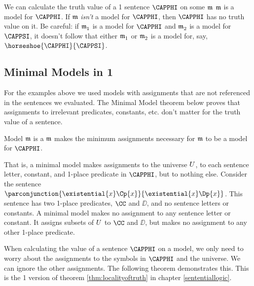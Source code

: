 We can calculate the truth value of a \GQL{}1 sentence $\CAPPHI$ on some $\mathfrak{m}$ \Iff $\mathfrak{m}$ is a model for $\CAPPHI$.  If $\mathfrak{m}$ \emph{isn't} a model for $\CAPPHI$, then $\CAPPHI$ has no truth value on it.  Be careful: if $\mathfrak{m^{\mathrm{}}_{\mathrm{1}}}$ is a model for $\CAPPHI$ and $\mathfrak{m^{\mathrm{}}_{\mathrm{2}}}$ is a model for $\CAPPSI$, it doesn't follow that either $\mathfrak{m^{\mathrm{}}_{\mathrm{1}}}$ or $\mathfrak{m^{\mathrm{}}_{\mathrm{2}}}$ is a model for, say, $\horseshoe{\CAPPHI}{\CAPPSI}$.

\subsection{Minimal Models in \GQL{}1}\label{Minimal Models in GQL1}

For the examples above we used models with assignments that are not referenced in the sentences we evaluated.
The Minimal Model theorem below proves that assignments to irrelevant predicates, constants, etc. don't matter for the truth value of a sentence.

\begin{majorILnc}{}
	Model $\mathfrak{m}$ is a  \Iff $\mathfrak{m}$ makes the minimum assignments necessary for $\mathfrak{m}$ to be a model for $\CAPPHI$.
\end{majorILnc}

\noindent{}That is, a minimal model makes assignments to the universe $U$, to each sentence letter, constant, and 1-place predicate in $\CAPPHI$, but to nothing else.
Consider the sentence $\parconjunction{\existential{\variable{x}}\Cp{\variable{x}}}{\existential{\variable{x}}\Dp{\variable{x}}}$.
This sentence has two 1-place predicates, $\CC$ and $\DD$, and no sentence letters or constants.
A minimal model makes no assignment to any sentence letter or constant.
It assigns subsets of $U$ to $\CC$ and $\DD$, but makes no assignment to any other 1-place predicate.

When calculating the value of a sentence $\CAPPHI$ on a model, we only need to worry about the assignments to the symbols in $\CAPPHI$ and the universe.
We can ignore the other assignments.
The following theorem demonstrates this.
This is the \GQL{}1 version of theorem \ref{thm:localityoftruth} in chapter \ref{sententiallogic}.

